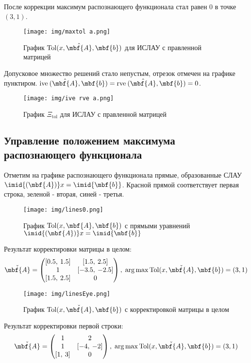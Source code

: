\documentclass[a4paper]{article}
\begin{document}
После коррекции максимум распознающего функционала стал равен $0$ в точке $(3,1)$.
\begin{figure}[H]
    \centering
    \texttt{[image: img/maxtol a.png]}
    \caption{График $\mathrm{Tol}(x,\hat{\mbf{A}}, \mbf{b})$ для ИСЛАУ с правленной матрицей}
    \label{fig:atol}
\end{figure}
Допусковое множество решений стало непустым, отрезок отмечен на графике пунктиром. $\mathrm{ive}\:(\hat{\mbf{A}}, \mbf{b})=\mathrm{rve}\:(\hat{\mbf{A}}, \mbf{b})=0$. 
\begin{figure}[H]
    \centering
    \texttt{[image: img/ive rve a.png]}
    \caption{График $\Xi_{\mathrm{tol}}$ для ИСЛАУ с правленной матрицей}
    \label{fig:aiverve}
\end{figure}
\subsection{Управление положением максимума распознающего функционала}
Отметим на графике распознающего функционала прямые, образованные СЛАУ $\imid{(\mbf{A})}x=\imid{\mbf{b}}$. Красной прямой соответствует первая строка, зеленой - вторая, синей - третья.
\begin{figure}[H]
    \centering
    \texttt{[image: img/lines0.png]}
    \caption{График $\mathrm{Tol}(x,\mbf{A},\mbf{b})$ с прямыми уравнений $\imid{(\mbf{A})}x=\imid{\mbf{b}}$}
    \label{fig:lines0}
\end{figure}
Результат корректировки матрицы в целом:
\begin{equation*}
    \check{\mbf{A}}=\begin{pmatrix}
    [0.5,\:1.5]&[1.5,\:2.5]\\
    1&[-3.5,\:-2.5]\\
    [1.5,\:2.5]&0
    \end{pmatrix},\;\mathrm{arg}\max\mathrm{Tol}(x,\check{\mbf{A}}, \mbf{b})=(3,1)
\end{equation*}
\begin{figure}[H]
    \centering
    \texttt{[image: img/linesEye.png]}
    \caption{График $\mathrm{Tol}(x,\check{\mbf{A}},\mbf{b})$ с корректировкой матрицы в целом}
    \label{fig:linesEye}
\end{figure}
Результат корректировки первой строки:
\begin{equation*}
    \check{\mbf{A}}=\begin{pmatrix}
    1&2\\
    1&[-4,\:-2]\\
    [1,\:3]&0
    \end{pmatrix},\;\mathrm{arg}\max\mathrm{Tol}(x,\check{\mbf{A}}, \mbf{b})=(3,1)
\end{equation*}
\end{document}
